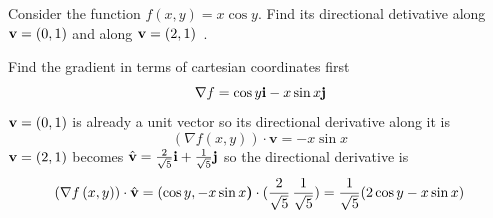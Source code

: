 \documentclass[a4paper]{article}
\numberwithin{equation}{section} %
\newcommand{\B}[1]{\textbf{\textup{#1}}} %
\begin{document}
\begin{exmp}
Consider the function $f(x,y)=x\cos y$. Find its directional detivative along $\B{v}=(0,1)$ and along $\B{v}=(2,1)$~\cite{gradient_pauls_ex}.
\end{exmp}
\begin{TheSolution}
Find the gradient in terms of cartesian coordinates first
\[
\nabla f = \cos y\B{i} -x \sin x\B{j}
\]
$\B{v}=(0,1)$ is already a unit vector so its directional derivative along it is
\[
\left( \nabla f\left( x,y \right) \right)\cdot \mathbf{v} = -x \sin x
\]
$\B{v}=(2,1)$ becomes $\hat{\B{v}}=\tfrac{2}{\sqrt{5}}\B{i}+\tfrac{1}{\sqrt{5}}\B{j}$ so the directional derivative is
\[
\left( \nabla f\left( x,y \right) \right)\cdot \hat{\mathbf{v}} = (\cos y, -x \sin x\B)\cdot (\frac{2}{\sqrt{5}}\,\frac{1}{\sqrt{5}}) =  	\frac{1}{\sqrt{5}}(2\cos y - x\sin x)
\]
\end{TheSolution}
\end{document}
